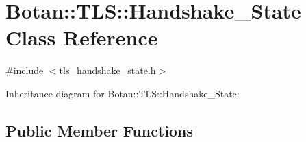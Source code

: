\hypertarget{class_botan_1_1_t_l_s_1_1_handshake___state}{}\section{Botan\+:\+:T\+LS\+:\+:Handshake\+\_\+\+State Class Reference}
\label{class_botan_1_1_t_l_s_1_1_handshake___state}


{\ttfamily \#include $<$tls\+\_\+handshake\+\_\+state.\+h$>$}



Inheritance diagram for Botan\+:\+:T\+LS\+:\+:Handshake\+\_\+\+State\+:
\subsection*{Public Member Functions}
